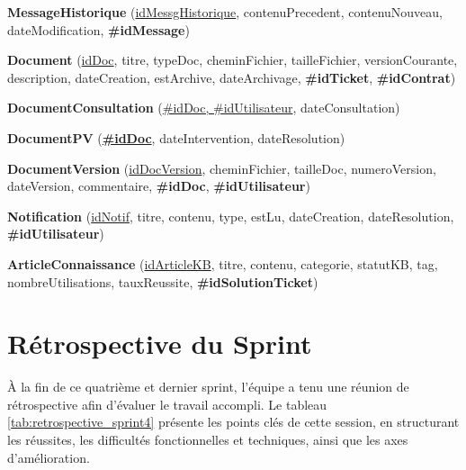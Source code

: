 \noindent\textbf{MessageHistorique} (\underline{idMessgHistorique}, contenuPrecedent, contenuNouveau, dateModification, \textbf{\#idMessage})

\noindent\textbf{Document} (\underline{idDoc}, titre, typeDoc, cheminFichier, tailleFichier, versionCourante, description, dateCreation, estArchive, dateArchivage, \textbf{\#idTicket}, \textbf{\#idContrat})

\noindent\textbf{DocumentConsultation} (\underline{\#idDoc, \#idUtilisateur}, dateConsultation)

\noindent\textbf{DocumentPV} (\underline{\textbf{\#idDoc}}, dateIntervention, dateResolution)

\noindent\textbf{DocumentVersion} (\underline{idDocVersion}, cheminFichier, tailleDoc, numeroVersion, dateVersion, commentaire, \textbf{\#idDoc}, \textbf{\#idUtilisateur})

\noindent\textbf{Notification} (\underline{idNotif}, titre, contenu, type, estLu, dateCreation, dateResolution, \textbf{\#idUtilisateur})

\noindent\textbf{ArticleConnaissance} (\underline{idArticleKB}, titre, contenu, categorie, statutKB, tag, nombreUtilisations, tauxReussite, \textbf{\#idSolutionTicket})
\section{Rétrospective du Sprint}
\label{sec:retrospective_sprint4}
À la fin de ce quatrième et dernier sprint, l'équipe a tenu une réunion de rétrospective afin d'évaluer le travail accompli. Le tableau \ref{tab:retrospective_sprint4} présente les points clés de cette session, en structurant les réussites, les difficultés fonctionnelles et techniques, ainsi que les axes d'amélioration.

